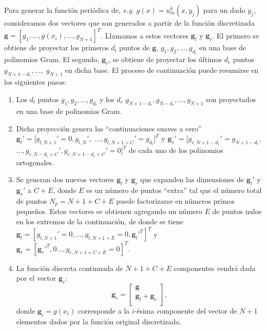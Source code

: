Para generar la función periódica de, \textit{e.g.} $g(x)=u^k_m(x,y_j)$ para un dado $y_j$, 
consideramos dos vectores 
que son generados a partir de la función discretizada 
$\mathbf{g}=[g_1,\ldots,g(x_i),\ldots,g_{N+1}]^T$. Llamamos a estos vectores
$\mathbf{g}_l$ y $\mathbf{g}_r$. El primero 
se obtiene de proyectar los primeros $d_l$ puntos de $\mathbf{g}$, $g_1,g_2,\ldots,g_{d_l}$ 
en una base de polinomios Gram. El segundo, $\mathbf{g}_r$, se 
obtiene de proyectar los últimos $d_r$ puntos $g_{N+1-d_r},\ldots,$ $g_{N+1}$ en dicha base. 
El proceso de continuación puede resumirse en los siguientes pasos:
\begin{enumerate}
\item Los $d_l$ puntos $g_1,g_2,\ldots,g_{d_l}$
y los $d_r$ $g_{N+1-d_r},g_{N-d_r},\ldots,g_{N+1}$ 
son proyectados en una base de polinomios Gram.

\item Dicha proyección genera las ``continuaciones suaves a cero'' 
$\mathbf{g}_l'=[g_{l,N+1}'=0,g_{l,N}',$ $\ldots,g_{l,N+1+C}'=g_{d_l}]^T$ y 
$\mathbf{g}_r'=[g_{r,N+1-d_r}'=g_{N+1-d_r},$ $\ldots,g_{r,N-d_r+C}',
g_{r,N+1-d_r+C}'=0]^T$ de cada 
uno de los polinomios ortogonales.

\item Se generan dos nuevos vectores $\mathbf{g}_l$ y $\mathbf{g}_r$ 
que expanden las dimensiones de $\mathbf{g}_l'$ y $\mathbf{g}_r'$ a $C+E$, 
donde $E$ es un número de puntos ``extra'' tal que el número total de puntos 
$N_p=N+1+C+E$ puede factorizarse en números primos pequeños. Estos 
vectores se obtienen agregando un número $E$ de puntos nulos 
en los extremos de la continuación, de donde se tiene 
$\mathbf{g}_l=[g_{l,N+1}'=0,\ldots,g_{l,N+1+E}=0,\mathbf{g}_l'^T]^T$
y $\mathbf{g}_r=[\mathbf{g}_r'^T,0\ldots,g_{r,N+1+C+E}=0]^T$.

\item La función discreta continuada de $N+1+C+E$ componentes 
vendrá dada por el vector $\mathbf{g}_c$:  
\begin{equation*}
\mathbf{g}_c=
\begin{bmatrix}
    \mathbf{g} \\
    \mathbf{g}_l+\mathbf{g}_r  \\
\end{bmatrix}
,
\label{eq:FCStepsCondensed}
\end{equation*}
donde $\mathbf{g}_i=g(x_i)$ corresponde a la $i$-ésima componente del vector 
de $N+1$ elementos dados por la función original discretizada.
\end{enumerate}

